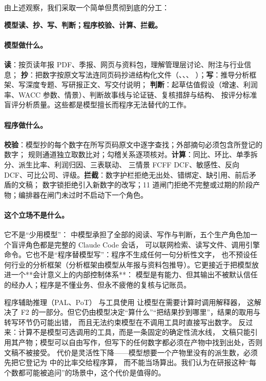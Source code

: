 由上述观察，我们采取一个简单但贯彻到底的分工：
\begin{center}
\textbf{模型读、抄、写、判断；程序校验、计算、拦截。}
\end{center}

\paragraph{模型做什么。}
\textbf{读}：按页读年报 PDF、季报、网页与资料包，理解管理层讨论、附注与行业信息；
\textbf{抄}：把数字按原文写法连同页码抄进结构化文件（、、、
）；\textbf{写}：推导分析框架、写深度专题、写研报正文、写交付说明；
\textbf{判断}：起草估值假设（增速、利润率、WACC 参数、情景）、判断故事线与论证链、复核措辞与结构、
按评分标准盲评分析质量。这些都是模型擅长而程序无法替代的工作。

\paragraph{程序做什么。}
\textbf{校验}：模型抄的每个数字在所写页码原文中逐字查找；外部摘句必须包含所登记的数字；
规则通道独立取数比对；勾稽关系逐项核对。\textbf{计算}：同比、环比、单季拆分、派生比率、利润归因、三表联动、
三情景 FCFF DCF、敏感性、反向 DCF、可比公司、评级。\textbf{拦截}：数字护栏拒绝无出处、错绑定、缺引用、前后矛盾的文稿；
数字锁拒绝引入新数字的改写；11 道闸门拒绝不完整或过期的阶段产物；编排器在闸门未过时不启动下一个角色。

\paragraph{这个立场不是什么。}
它不是“少用模型”：\sysname{} 中模型承担了全部的阅读、写作与判断，五个生产角色加一个盲评角色都是完整的 Claude Code 会话，
可以联网检索、读写文件、调用引擎命令。它也不是“程序替模型写”：程序不生成任何一句分析性文字，
也不预设任何行业的分析框架（分析框架由模型从年报与资料包推导）。它更接近于把模型放进一个**会计意义上的内部控制体系**：
模型是有能力、但其输出不被默认信任的经办人；程序是不懂业务、但永不疲倦的复核与记账员。

\begin{tradeoff}[：为什么不让模型调用计算器工具了事]
程序辅助推理（PAL、PoT）\cite{gao2023pal,chen2023pot} 与工具使用\cite{schick2023toolformer,yao2023react} 让模型在需要计算时调用解释器，
这解决了 F2 的一部分。但它仍由模型决定“算什么”“把结果抄到哪里”，结果的取用与转写环节仍可能出错，
而且无法约束模型在不调用工具时直接写出数字。\sysname{} 反过来：计算不是模型可选调用的工具，而是一条固定的确定性流水线，
文稿只能引用其产物；模型可以自由写作，但写下的任何数字都必须在产物中找到出处，否则文稿不被接受。
代价是灵活性下降——模型想要一个产物里没有的派生数，必须先把它登记为  中的比率交给程序算，
而不能当场算出。我们认为在研报这种“每个数都可能被追问”的场景中，这个代价是值得的。
\end{tradeoff}

